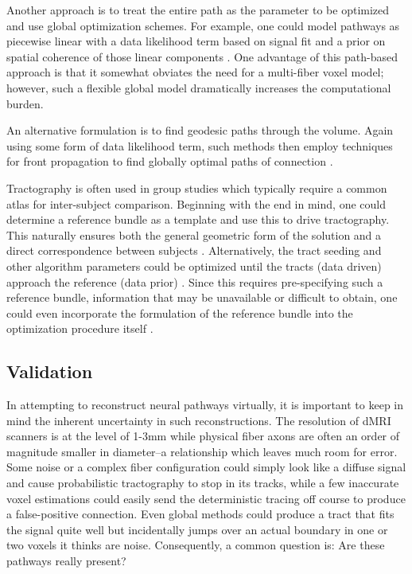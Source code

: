 \documentclass[final,hyperref]{gatech-thesis}
\begin{document}
Another approach is to treat the entire path as the parameter to be optimized
and use global optimization schemes.
%
For example, one could model pathways as piecewise linear with a data
likelihood term based on signal fit and a prior on spatial coherence of those
linear components \cite{Kreher2008,Reisert2009}.  One advantage of this
path-based approach is that it somewhat obviates the need for a multi-fiber
voxel model; however, such a flexible global model dramatically increases the
computational burden.

An alternative formulation is to find geodesic paths through the volume.
Again using some form of data likelihood term, such methods then employ
techniques for front propagation to find globally optimal paths of connection
\cite{ODonnell2002,Pichon2005,Prados2006,Lenglet2004eccv,Fletcher2007ipmi}.

Tractography is often used in group studies which typically require a common
atlas for inter-subject comparison.  Beginning with the end in mind, one could
determine a reference bundle as a template and use this to drive tractography.
This naturally ensures both the general geometric form of the solution and a
direct correspondence between subjects \cite{Eckstein2009,Goodlett2009}.
%
Alternatively, the tract seeding and other algorithm parameters could be
optimized until the tracts (data driven) approach the reference (data prior)
\cite{Clayden2007}.  Since this requires pre-specifying such a reference
bundle, information that may be unavailable or difficult to obtain, one could
even incorporate the formulation of the reference bundle into the optimization
procedure itself \cite{Clayden2009}.




\subsection{Validation}

In attempting to reconstruct neural pathways virtually, it is important to
keep in mind the inherent uncertainty in such reconstructions.  The resolution
of dMRI scanners is at the level of 1-3mm while physical fiber axons are
often an order of magnitude smaller in diameter--a relationship which leaves
much room for error.
%
Some noise or a complex fiber configuration could simply look like a diffuse
signal and cause probabilistic tractography to stop in its tracks, while a few
inaccurate voxel estimations could easily send the deterministic tracing off
course to produce a false-positive connection.  Even global methods could
produce a tract that fits the signal quite well but incidentally jumps over an
actual boundary in one or two voxels it thinks are noise.  Consequently, a
common question is: Are these pathways really present?
\end{document}
